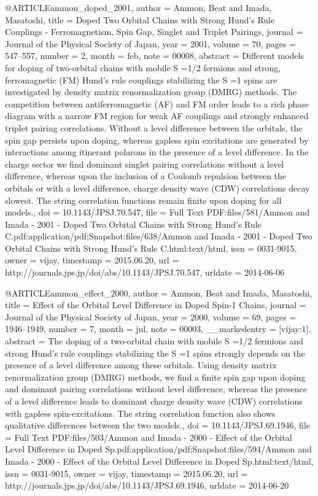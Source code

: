 @ARTICLE{ammon_doped_2001,
  author = {Ammon, Beat and Imada, Masatoshi},
  title = {Doped {Two} {Orbital} {Chains} with {Strong} {Hund}'s {Rule} {Couplings}
	- {Ferromagnetism}, {Spin} {Gap}, {Singlet} and {Triplet} {Pairings}},
  journal = {Journal of the Physical Society of Japan},
  year = {2001},
  volume = {70},
  pages = {547--557},
  number = {2},
  month = feb,
  note = {00008},
  abstract = {Different models for doping of two-orbital chains with mobile S =1/2
	fermions and strong, ferromagnetic (FM) Hund's rule couplings stabilizing
	the S =1 spins are investigated by density matrix renormalization
	group (DMRG) methods. The competition between antiferromagnetic (AF)
	and FM order leads to a rich phase diagram with a narrow FM region
	for weak AF couplings and strongly enhanced triplet pairing correlations.
	Without a level difference between the orbitals, the spin gap persists
	upon doping, whereas gapless spin excitations are generated by interactions
	among itinerant polarons in the presence of a level difference. In
	the charge sector we find dominant singlet pairing correlations without
	a level difference, whereas upon the inclusion of a Coulomb repulsion
	between the orbitals or with a level difference, charge density wave
	(CDW) correlations decay slowest. The string correlation functions
	remain finite upon doping for all models.},
  doi = {10.1143/JPSJ.70.547},
  file = {Full Text PDF:files/581/Ammon and Imada - 2001 - Doped Two Orbital Chains with Strong Hund's Rule C.pdf:application/pdf;Snapshot:files/638/Ammon and Imada - 2001 - Doped Two Orbital Chains with Strong Hund's Rule C.html:text/html},
  issn = {0031-9015},
  owner = {vijay},
  timestamp = {2015.06.20},
  url = {http://journals.jps.jp/doi/abs/10.1143/JPSJ.70.547},
  urldate = {2014-06-06}
}

@ARTICLE{ammon_effect_2000,
  author = {Ammon, Beat and Imada, Masatoshi},
  title = {Effect of the {Orbital} {Level} {Difference} in {Doped} {Spin}-1
	{Chains}},
  journal = {Journal of the Physical Society of Japan},
  year = {2000},
  volume = {69},
  pages = {1946--1949},
  number = {7},
  month = jul,
  note = {00003},
  __markedentry = {[vijay:1]},
  abstract = {The doping of a two-orbital chain with mobile S =1/2 fermions and
	strong Hund's rule couplings stabilizing the S =1 spins strongly
	depends on the presence of a level difference among these orbitals.
	Using density matrix renormalization group (DMRG) methods, we find
	a finite spin gap upon doping and dominant pairing correlations without
	level difference, whereas the presence of a level difference leads
	to dominant charge density wave (CDW) correlations with gapless spin-excitations.
	The string correlation function also shows qualitative differences
	between the two models.},
  doi = {10.1143/JPSJ.69.1946},
  file = {Full Text PDF:files/503/Ammon and Imada - 2000 - Effect of the Orbital Level Difference in Doped Sp.pdf:application/pdf;Snapshot:files/594/Ammon and Imada - 2000 - Effect of the Orbital Level Difference in Doped Sp.html:text/html},
  issn = {0031-9015},
  owner = {vijay},
  timestamp = {2015.06.20},
  url = {http://journals.jps.jp/doi/abs/10.1143/JPSJ.69.1946},
  urldate = {2014-06-20}
}

